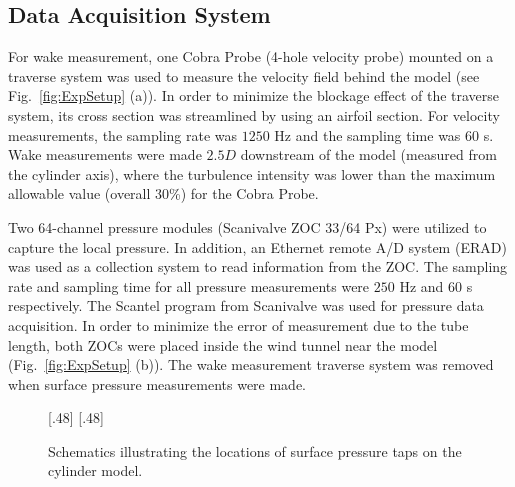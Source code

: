 \subsection{Data Acquisition System}
\label{sec:data_acquisition}
%
For wake measurement, one Cobra Probe (4-hole velocity probe) mounted on a
traverse system was used to measure the velocity field behind the model (see
Fig.~\ref{fig:ExpSetup} (a)). In order to minimize the blockage effect of the
traverse system, its cross section was streamlined by using an airfoil section.
For velocity measurements, the sampling rate was $1250$ Hz and the sampling
time was $60$ s. Wake measurements were made $2.5 D$ downstream of the model
(measured from the cylinder axis), where the turbulence intensity was lower
than the maximum allowable value (overall 30\%) for the Cobra Probe.  

Two 64-channel pressure modules (Scanivalve ZOC 33/64 Px) were utilized to
capture the local pressure. In addition, an Ethernet remote A/D system (ERAD)
was used as a collection system to read information from the ZOC. The sampling
rate and sampling time for all pressure measurements were $250$ Hz and $60$ s
respectively. The Scantel program from Scanivalve was used for pressure data
acquisition. In order to minimize the error of measurement due to the tube
length, both ZOCs were placed inside the wind tunnel near the model
(Fig.~\ref{fig:ExpSetup} (b)). The wake measurement traverse system was removed
when surface pressure measurements were made.
%
\begin{figure}[htb!]
  \centering
    [.48\linewidth]{}
  \hspace*{\fill}
    [.48\linewidth]{}
  \caption{Schematics illustrating the locations of surface pressure taps on
    the cylinder model.}
  \label{fig:experimentTaps}
\end{figure}

